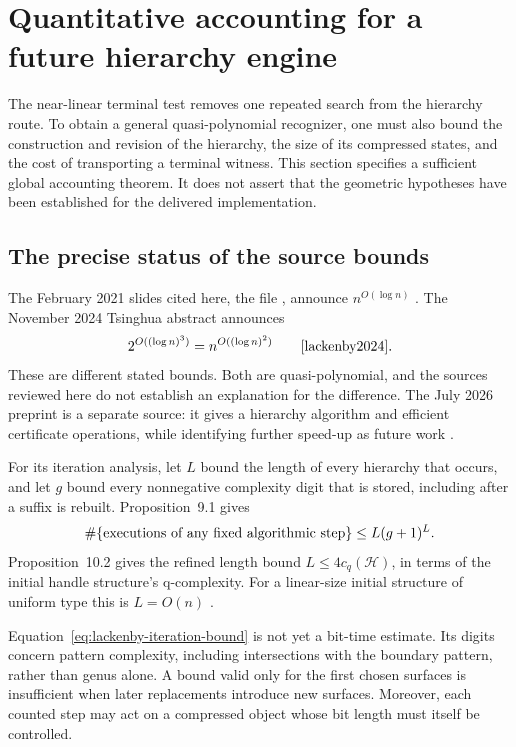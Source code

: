 \section{Quantitative accounting for a future hierarchy engine}
\label{sec:hierarchy-accounting}

The near-linear terminal test removes one repeated search from the
hierarchy route.  To obtain a general quasi-polynomial recognizer, one
must also bound the construction and revision of the hierarchy, the
size of its compressed states, and the cost of transporting a terminal
witness.  This section specifies a sufficient global accounting theorem.
It does not assert that the geometric hypotheses have been established
for the delivered implementation.

\subsection{The precise status of the source bounds}

The February 2021 slides cited here, the file
, announce
$n^{O(\log n)}$ \cite{lackenbytalk}.  The November 2024 Tsinghua abstract
announces
\[
 2^{O((\log n)^3)}=n^{O((\log n)^2)}
 \qquad\cite{lackenby2024}.
\]
These are different stated bounds.  Both are quasi-polynomial, and the
sources reviewed here do not establish an explanation for the difference.
The July 2026 preprint is a separate source: it gives a hierarchy
algorithm and efficient certificate operations, while identifying further
speed-up as future work \cite{lackenby2026}.

For its iteration analysis, let $L$ bound the length of every hierarchy
that occurs, and let $g$ bound every nonnegative complexity digit that
is stored, including after a suffix is rebuilt.  Proposition~9.1 gives
\begin{equation}
 \#\{\hbox{executions of any fixed algorithmic step}\}
 \leq L(g+1)^L.
 \label{eq:lackenby-iteration-bound}
\end{equation}
Proposition~10.2 gives the refined length bound
$L\leq4c_q(\mathcal H)$, in terms of the initial handle structure's
q-complexity.  For a linear-size initial structure of uniform type this
is $L=O(n)$ \cite[Props.~9.1 and 10.2]{lackenby2026}.

Equation~\eqref{eq:lackenby-iteration-bound} is not yet a bit-time estimate.
Its digits concern pattern complexity, including intersections with the
boundary pattern, rather than genus alone.  A bound valid only for the
first chosen surfaces is insufficient when later replacements introduce
new surfaces.  Moreover, each counted step may act on a compressed object
whose bit length must itself be controlled.

